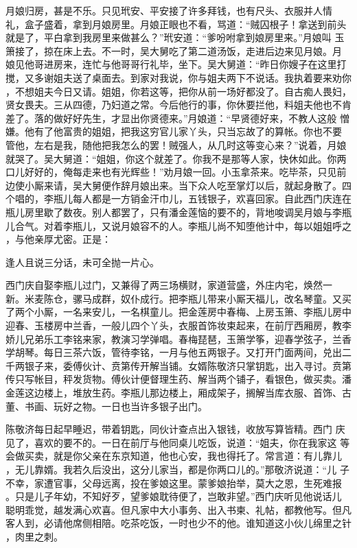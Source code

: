月娘归房，甚是不乐。只见玳安、平安接了许多拜钱，也有尺头、衣服并人情
礼，盒子盛着，拿到月娘房里。月娘正眼也不看，骂道：“贼囚根子！拿送到前头
就是了，平白拿到我房里来做甚么？”玳安道：“爹吩咐拿到娘房里来。”月娘叫
玉箫接了，掠在床上去。不一时，吴大舅吃了第二道汤饭，走进后边来见月娘。月
娘见他哥进房来，连忙与他哥哥行礼毕，坐下。吴大舅道：“昨日你嫂子在这里打
搅，又多谢姐夫送了桌面去。到家对我说，你与姐夫两下不说话。我执着要来劝你
，不想姐夫今日又请。姐姐，你若这等，把你从前一场好都没了。自古痴人畏妇，
贤女畏夫。三从四德，乃妇道之常。今后他行的事，你休要拦他，料姐夫他也不肯
差了。落的做好好先生，才显出你贤德来。”月娘道：“早贤德好来，不教人这般
憎嫌。他有了他富贵的姐姐，把我这穷官儿家丫头，只当忘故了的算帐。你也不要
管他，左右是我，随他把我怎么的罢！贼强人，从几时这等变心来？”说着，月娘
就哭了。吴大舅道：“姐姐，你这个就差了。你我不是那等人家，快休如此。你两
口儿好好的，俺每走来也有光辉些！”劝月娘一回。小玉拿茶来。吃毕茶，只见前
边使小厮来请，吴大舅便作辞月娘出来。当下众人吃至掌灯以后，就起身散了。四
个唱的，李瓶儿每人都是一方销金汗巾儿，五钱银子，欢喜回家。自此西门庆连在
瓶儿房里歇了数夜。别人都罢了，只有潘金莲恼的要不的，背地唆调吴月娘与李瓶
儿合气。对着李瓶儿，又说月娘容不的人。李瓶儿尚不知堕他计中，每以姐姐呼之
，与他亲厚尤密。正是：

逢人且说三分话，未可全抛一片心。

西门庆自娶李瓶儿过门，又兼得了两三场横财，家道营盛，外庄内宅，焕然一
新。米麦陈仓，骡马成群，奴仆成行。把李瓶儿带来小厮天福儿，改名琴童。又买
了两个小厮，一名来安儿，一名棋童儿。把金莲房中春梅、上房玉箫、李瓶儿房中
迎春、玉楼房中兰香，一般儿四个丫头，衣服首饰妆束起来，在前厅西厢房，教李
娇儿兄弟乐工李铭来家，教演习学弹唱。春梅琵琶，玉箫学筝，迎春学弦子，兰香
学胡琴。每日三茶六饭，管待李铭，一月与他五两银子。又打开门面两间，兑出二
千两银子来，委傅伙计、贲第传开解当铺。女婿陈敬济只掌钥匙，出入寻讨。贲第
传只写帐目，秤发货物。傅伙计便督理生药、解当两个铺子，看银色，做买卖。潘
金莲这边楼上，堆放生药。李瓶儿那边楼上，厢成架子，搁解当库衣服、首饰、古
董、书画、玩好之物。一日也当许多银子出门。

陈敬济每日起早睡迟，带着钥匙，同伙计查点出入银钱，收放写算皆精。西门
庆见了，喜欢的要不的。一日在前厅与他同桌儿吃饭，说道：“姐夫，你在我家这
等会做买卖，就是你父亲在东京知道，他也心安，我也得托了。常言道：有儿靠儿
，无儿靠婿。我若久后没出，这分儿家当，都是你两口儿的。”那敬济说道：“儿
子不幸，家遭官事，父母远离，投在爹娘这里。蒙爹娘抬举，莫大之恩，生死难报
。只是儿子年幼，不知好歹，望爹娘耽待便了，岂敢非望。”西门庆听见他说话儿
聪明乖觉，越发满心欢喜。但凡家中大小事务、出入书柬、礼帖，都教他写。但凡
客人到，必请他席侧相陪。吃茶吃饭，一时也少不的他。谁知道这小伙儿绵里之针
，肉里之刺。

